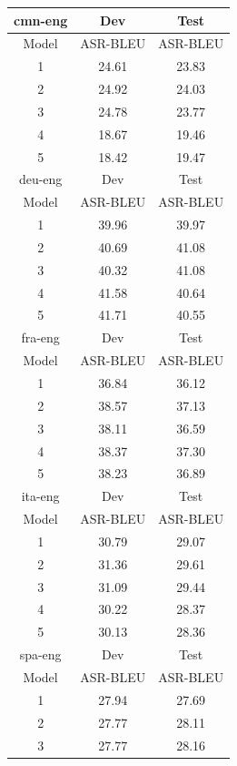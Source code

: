 \begin{table}[htbp!]
    \tiny
    \centering
    \begin{tabular}{c|c|c}
    \hline
      {cmn-eng} & \multicolumn{1}{c|}{Dev} & \multicolumn{1}{c}{Test} \\ \hline
      Model & ASR-BLEU & ASR-BLEU \\ \hline
1 & 24.61 & 23.83  \\
2 & 24.92 & 24.03 \\
3 & 24.78 & 23.77 \\
4 & 18.67 & 19.46 \\
5 & 18.42 & 19.47 \\
\hline
      {deu-eng} & \multicolumn{1}{c|}{Dev} & \multicolumn{1}{c}{Test} \\ \hline
      Model & ASR-BLEU &  ASR-BLEU \\ \hline
1 & 39.96 & 39.97 \\
2 & 40.69 & 41.08 \\
3 & 40.32 & 41.08 \\
4 & 41.58 & 40.64 \\
5 & 41.71 & 40.55 \\ 
\hline
      {fra-eng} & \multicolumn{1}{c|}{Dev} & \multicolumn{1}{c}{Test} \\ \hline
      Model & ASR-BLEU & ASR-BLEU \\ \hline
1 & 36.84 & 36.12 \\
2 & 38.57 & 37.13 \\
3 & 38.11 & 36.59 \\
4 & 38.37 & 37.30 \\
5 & 38.23 & 36.89 \\
\hline
      {ita-eng} & \multicolumn{1}{c|}{Dev} & \multicolumn{1}{c}{Test} \\ \hline
      Model & ASR-BLEU &  ASR-BLEU \\ \hline
1 & 30.79 & 29.07 \\
2 & 31.36 & 29.61 \\
3 & 31.09 & 29.44 \\
4 & 30.22 & 28.37 \\
5 & 30.13 & 28.36 \\
\hline
      {spa-eng} & \multicolumn{1}{c|}{Dev} & \multicolumn{1}{c}{Test} \\ \hline
      Model & ASR-BLEU &  ASR-BLEU \\ \hline
1 & 27.94 & 27.69 \\
2 & 27.77 & 28.11 \\
3 & 27.77 & 28.16  \\

\end{tabular}
\end{table}
